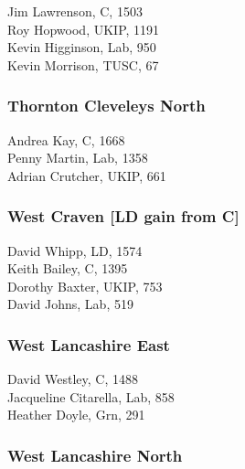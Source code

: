 \documentclass[a4paper,openany,10pt]{book}
\begin{document}


Jim Lawrenson, C, 1503\\
Roy Hopwood, UKIP, 1191\\
Kevin Higginson, Lab, 950\\
Kevin Morrison, TUSC, 67\\


\subsubsection*{Thornton Cleveleys North}



Andrea Kay, C, 1668\\
Penny Martin, Lab, 1358\\
Adrian Crutcher, UKIP, 661\\


\subsubsection*{West Craven \hspace*{\fill}\nolinebreak[1]%
\enspace\hspace*{\fill}
[LD gain from C]}



David Whipp, LD, 1574\\
Keith Bailey, C, 1395\\
Dorothy Baxter, UKIP, 753\\
David Johns, Lab, 519\\


\subsubsection*{West Lancashire East}



David Westley, C, 1488\\
Jacqueline Citarella, Lab, 858\\
Heather Doyle, Grn, 291\\


\subsubsection*{West Lancashire North}
\end{document}

